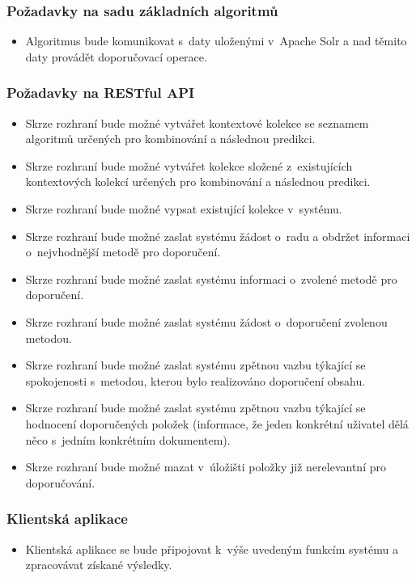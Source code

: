 \documentclass[thesis=M,czech]{FITthesis}[2014/05/07]
\begin{document}
\subsubsection{Požadavky na sadu základních algoritmů}
\begin{itemize}
	\item Algoritmus bude komunikovat s~daty uloženými v~Apache Solr a nad těmito daty provádět doporučovací operace.
\end{itemize}

\subsubsection{Požadavky na RESTful API}
\begin{itemize}
	\item Skrze rozhraní bude možné vytvářet kontextové kolekce se seznamem algoritmů určených pro kombinování a následnou predikci.
	\item Skrze rozhraní bude možné vytvářet kolekce složené z~existujících kontextových kolekcí určených pro kombinování a následnou predikci.
	\item Skrze rozhraní bude možné vypsat existující kolekce v~systému.		
	\item Skrze rozhraní bude možné zaslat systému žádost o~radu a obdržet informaci o~nejvhodnější metodě pro doporučení.
	\item Skrze rozhraní bude možné zaslat systému informaci o~zvolené metodě pro doporučení.
	\item Skrze rozhraní bude možné zaslat systému žádost o~doporučení zvolenou metodou.	
	\item Skrze rozhraní bude možné zaslat systému zpětnou vazbu týkající se spokojenosti s~metodou, kterou bylo realizováno doporučení obsahu.
	\item Skrze rozhraní bude možné zaslat systému zpětnou vazbu týkající se hodnocení doporučených položek (informace, že jeden konkrétní uživatel dělá něco s~jedním konkrétním dokumentem).
	\item Skrze rozhraní bude možné mazat v~úložišti položky již nerelevantní pro doporučování. 
\end{itemize}

\subsubsection{Klientská aplikace}
\begin{itemize}
	\item Klientská aplikace se bude připojovat k~výše uvedeným funkcím systému a zpracovávat získané výsledky.
\end{itemize}
\end{document}
